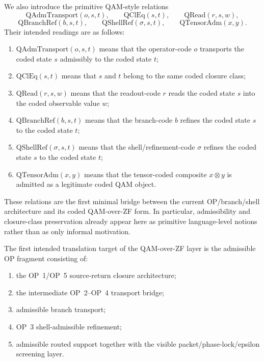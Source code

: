 \begin{definition}
We also introduce the primitive QAM-style relations
\[
\mathrm{QAdmTransport}(o,s,t),\qquad
\mathrm{QClEq}(s,t),\qquad
\mathrm{QRead}(r,s,w),
\]
\[
\mathrm{QBranchRef}(b,s,t),\qquad
\mathrm{QShellRef}(\sigma,s,t),\qquad
\mathrm{QTensorAdm}(x,y).
\]
Their intended readings are as follows:
\begin{enumerate}
\item $\mathrm{QAdmTransport}(o,s,t)$ means that the operator-code $o$ transports the coded state $s$ admissibly to the coded state $t$;
\item $\mathrm{QClEq}(s,t)$ means that $s$ and $t$ belong to the same coded closure class;
\item $\mathrm{QRead}(r,s,w)$ means that the readout-code $r$ reads the coded state $s$ into the coded observable value $w$;
\item $\mathrm{QBranchRef}(b,s,t)$ means that the branch-code $b$ refines the coded state $s$ to the coded state $t$;
\item $\mathrm{QShellRef}(\sigma,s,t)$ means that the shell/refinement-code $\sigma$ refines the coded state $s$ to the coded state $t$;
\item $\mathrm{QTensorAdm}(x,y)$ means that the tensor-coded composite $x\otimes y$ is admitted as a legitimate coded QAM object.
\end{enumerate}
\end{definition}

\begin{remark}
These relations are the first minimal bridge between the current OP/branch/shell architecture and its coded QAM-over-ZF form. In particular, admissibility and closure-class preservation already appear here as primitive language-level notions rather than as only informal motivation.
\end{remark}

\begin{definition}
The first intended translation target of the QAM-over-ZF layer is the admissible OP fragment consisting of:
\begin{enumerate}
\item the OP~1/OP~5 source-return closure architecture;
\item the intermediate OP~2--OP~4 transport bridge;
\item admissible branch transport;
\item OP~3 shell-admissible refinement;
\item admissible routed support together with the visible packet/phase-lock/epsilon screening layer.
\end{enumerate}
\end{definition}

